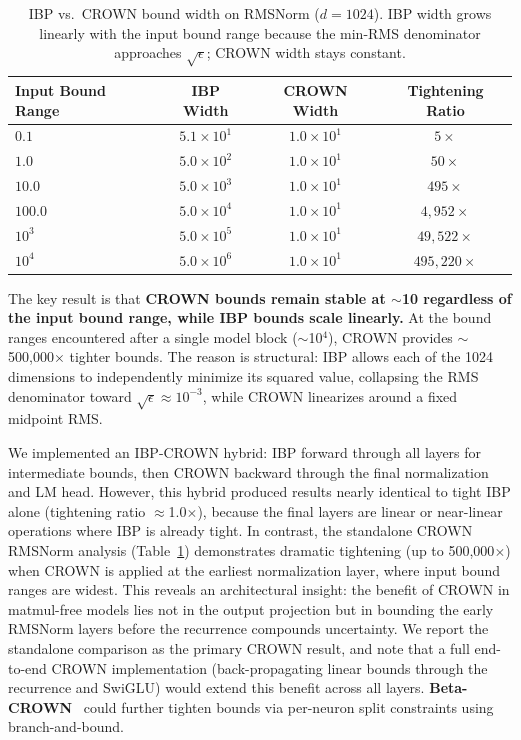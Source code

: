 \documentclass[11pt]{article}
\begin{document}
\begin{table}[H]
    \centering
    \caption{IBP vs.\ CROWN bound width on RMSNorm ($d{=}1024$). IBP width grows linearly with the input bound range because the min-RMS denominator approaches $\sqrt{\epsilon}$; CROWN width stays constant.}
    \label{tab:crown_ibp}
    \begin{tabular}{lccc}
        \toprule
        \textbf{Input Bound Range} & \textbf{IBP Width} & \textbf{CROWN Width} & \textbf{Tightening Ratio} \\
        \midrule
        $0.1$   & $5.1 \times 10^1$ & $1.0 \times 10^1$ & $5\times$ \\
        $1.0$   & $5.0 \times 10^2$ & $1.0 \times 10^1$ & $50\times$ \\
        $10.0$  & $5.0 \times 10^3$ & $1.0 \times 10^1$ & $495\times$ \\
        $100.0$ & $5.0 \times 10^4$ & $1.0 \times 10^1$ & $4{,}952\times$ \\
        $10^3$  & $5.0 \times 10^5$ & $1.0 \times 10^1$ & $49{,}522\times$ \\
        $10^4$  & $5.0 \times 10^6$ & $1.0 \times 10^1$ & $495{,}220\times$ \\
        \bottomrule
    \end{tabular}
\end{table}

The key result is that \textbf{CROWN bounds remain stable at $\sim$10 regardless of the input bound range, while IBP bounds scale linearly.} At the bound ranges encountered after a single model block ($\sim$10$^4$), CROWN provides $\sim$500,000$\times$ tighter bounds. The reason is structural: IBP allows each of the 1024 dimensions to independently minimize its squared value, collapsing the RMS denominator toward $\sqrt{\epsilon} \approx 10^{-3}$, while CROWN linearizes around a fixed midpoint RMS.

We implemented an IBP-CROWN hybrid: IBP forward through all layers for intermediate bounds, then CROWN backward through the final normalization and LM head. However, this hybrid produced results nearly identical to tight IBP alone (tightening ratio $\approx$1.0$\times$), because the final layers are linear or near-linear operations where IBP is already tight. In contrast, the standalone CROWN RMSNorm analysis (Table~\ref{tab:crown_ibp}) demonstrates dramatic tightening (up to 500,000$\times$) when CROWN is applied at the earliest normalization layer, where input bound ranges are widest. This reveals an architectural insight: the benefit of CROWN in matmul-free models lies not in the output projection but in bounding the early RMSNorm layers before the recurrence compounds uncertainty. We report the standalone comparison as the primary CROWN result, and note that a full end-to-end CROWN implementation (back-propagating linear bounds through the recurrence and SwiGLU) would extend this benefit across all layers. \textbf{Beta-CROWN}~\cite{wang2021beta} could further tighten bounds via per-neuron split constraints using branch-and-bound.
\end{document}
